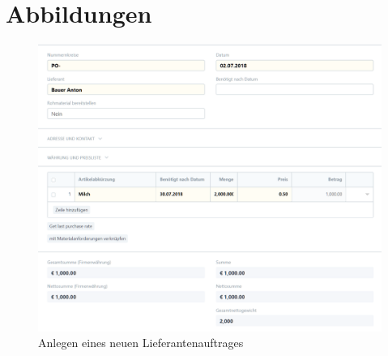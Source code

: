 \chapter{Abbildungen}
\begin{figure}[H]
  \centering
  \includegraphics[width=\textwidth]{Bilder/Lieferantenauftrag.PNG}
  \caption{Anlegen eines neuen Lieferantenauftrages}
  \label{fig:liefAuftrag}
\end{figure}
